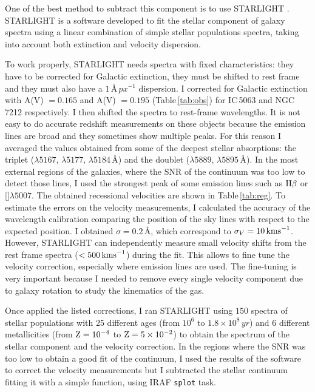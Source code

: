 \documentclass[../main.tex]{subfiles}
\begin{document}
One of the best method to subtract this component is to use STARLIGHT \citep{Fernandes05, Mateus06, Fernandes07}.
STARLIGHT is a software developed to fit the stellar component of galaxy spectra using a linear combination of simple stellar populations spectra, taking into account both extinction and velocity dispersion.

To work properly, STARLIGHT needs spectra with fixed characteristics: they have to be corrected for Galactic extinction, they must be shifted to rest frame and they must also have a $1\,\si{\angstrom\,px^{-1}}$ dispersion.
I corrected for Galactic extinction with A(V) $= 0.165$ and A(V) $=0.195$ (Table\,\ref{tab:obs}) for IC\,5063 and NGC\,7212 respectively. 
I then shifted the spectra to rest-frame wavelengths.
It is not easy to do accurate redshift measurements on these objects because the emission lines are broad and they sometimes show multiple peaks. 
For this reason I averaged the values obtained from some of the deepest stellar absorptions: the  triplet ($\lambda5167,\,\lambda5177,\,\lambda5184$\,\AA) and the  doublet ($\lambda5889,\,\lambda5895$\,\AA).
In the most external regions of the galaxies, where the SNR of the continuum was too low to detect those lines, I  used the strongest peak of some emission lines such as $\Hb$ or []$\lambda5007$.
The obtained recessional velocities are shown in Table\,\ref{tab:reg}.
To estimate the errors on the velocity measurements, I calculated the accuracy of the wavelength calibration comparing the position of the sky lines with respect to the expected position.
I obtained $\sigma = 0.2\,\si{\angstrom}$, which correspond to $\sigma_V=10\,\si{\kms}$.
However, STARLIGHT can independently measure small velocity shifts from the rest frame spectra ($< 500\,\si{\kms}$) during the fit.
This allows to fine tune the velocity correction, especially where emission lines are used.
The fine-tuning is very important because I needed to remove every single velocity component due to galaxy rotation to study the kinematics of the gas.

Once applied the listed corrections, I ran STARLIGHT using $150$ spectra of stellar populations with 25 different ages (from $10^6$ to $1.8\times10^8\,\si{yr}$) and 6 different metallicities (from $\rm Z=10^{-4}$ to $\rm Z=5\times 10^{-2}$) to obtain the spectrum of the stellar component and the velocity correction.
In the regions where the SNR was too low to obtain a good fit of the continuum, I used the results of the software to correct the velocity measurements but I subtracted the stellar continuum fitting it with a simple function, using IRAF \verb!splot! task.
\end{document}
